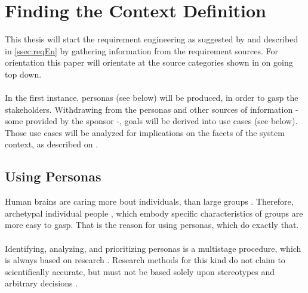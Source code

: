 \section{Finding the Context Definition}
This thesis will start the requirement engineering as suggested by \textcite{Pohl.2007} and described in \cref{ssec:reqEn} by gathering information from the requirement sources. For orientation this paper will orientate at the source categories shown in  on  going top down. 

\paragraph{} In the first instance, personas (see below) will be produced, in order to gasp the stakeholders. Withdrawing from the personas and other sources of information - some provided by the sponsor -, goals will be derived into use cases (see below). Those use cases will be analyzed for implications on the facets of the system context, as described on . 


\subsection{Using Personas}
Human brains are caring more bout individuals, than large groups \parencite[cf.][]{Platt.2016}. Therefore, archetypal individual people \parencite[cf.][81-82]{Cooper.2007}, which embody specific characteristics of groups \parencite[cf.][]{Platt.2016} are more easy to gasp. That is the reason for using personas, which do exactly that.

\paragraph{} Identifying, analyzing, and prioritizing personas is a multistage procedure, which is always based on research \parencite[cf.][39]{Robier.2016}. Research methods for this kind do not claim to scientifically accurate, but must not be based solely upon stereotypes and arbitrary decisions \parencite[cf.][82-83]{Cooper.2007}. 

